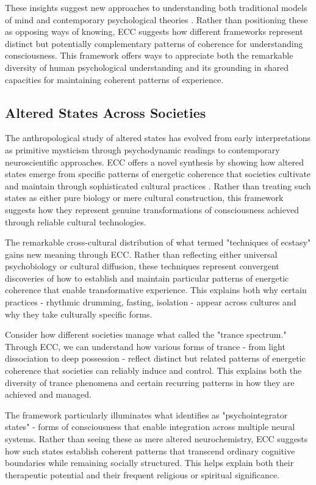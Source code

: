These insights suggest new approaches to understanding both traditional models of mind and contemporary psychological theories \cite{turner1967forest}. Rather than positioning these as opposing ways of knowing, ECC suggests how different frameworks represent distinct but potentially complementary patterns of coherence for understanding consciousness. This framework offers ways to appreciate both the remarkable diversity of human psychological understanding and its grounding in shared capacities for maintaining coherent patterns of experience.

\subsection{Altered States Across Societies}

The anthropological study of altered states has evolved from early interpretations as primitive mysticism through psychodynamic readings to contemporary neuroscientific approaches. ECC offers a novel synthesis by showing how altered states emerge from specific patterns of energetic coherence that societies cultivate and maintain through sophisticated cultural practices \cite{bourguignon1976possession}. Rather than treating such states as either pure biology or mere cultural construction, this framework suggests how they represent genuine transformations of consciousness achieved through reliable cultural technologies.

The remarkable cross-cultural distribution of what \cite{eliade1964shamanism} termed "techniques of ecstasy" gains new meaning through ECC. Rather than reflecting either universal psychobiology or cultural diffusion, these techniques represent convergent discoveries of how to establish and maintain particular patterns of energetic coherence that enable transformative experience. This explains both why certain practices - rhythmic drumming, fasting, isolation - appear across cultures and why they take culturally specific forms.

Consider how different societies manage what \cite{lapassade1990transe} called the "trance spectrum." Through ECC, we can understand how various forms of trance - from light dissociation to deep possession - reflect distinct but related patterns of energetic coherence that societies can reliably induce and control. This explains both the diversity of trance phenomena and certain recurring patterns in how they are achieved and managed.

The framework particularly illuminates what \cite{winkelman2010shamanism} identifies as "psychointegrator states" - forms of consciousness that enable integration across multiple neural systems. Rather than seeing these as mere altered neurochemistry, ECC suggests how such states establish coherent patterns that transcend ordinary cognitive boundaries while remaining socially structured. This helps explain both their therapeutic potential and their frequent religious or spiritual significance.

